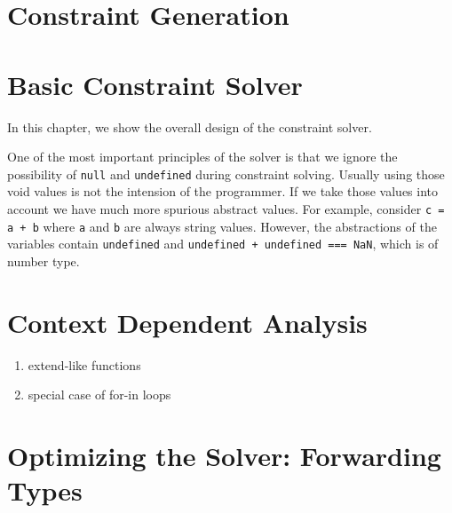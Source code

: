 \documentclass{report}
\begin{document}
\chapter{Constraint Generation}

\chapter{Basic Constraint Solver}

In this chapter, we show the overall design of the constraint solver. 

One of the most important principles of the solver is that 
we ignore the possibility of \texttt{null} and \texttt{undefined} 
during constraint solving.
Usually using those void values is not the intension of the programmer.
If we take those values into account 
we have much more spurious abstract values.
For example, consider \texttt{c = a + b} where \texttt{a} and \texttt{b} 
are always string values. 
However, the abstractions of the variables contain \texttt{undefined} and
\texttt{undefined + undefined === NaN}, which is of number type. 


\chapter{Context Dependent Analysis}
\begin{enumerate}
\item extend-like functions
\item special case of for-in loops
\end{enumerate}

\chapter{Optimizing the Solver: Forwarding Types}
\end{document}
